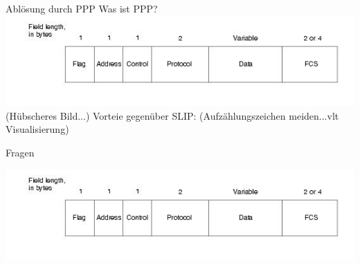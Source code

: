 \documentclass[beamer]{uibk}
\begin{document}
\begin{frame}{Ablösung durch PPP}
Was ist PPP?\newline
\includegraphics[scale=0.5]{ppp.jpg}
(Hübscheres Bild...)\newline
Vorteie gegenüber SLIP:\newline
(Aufzählungszeichen meiden...vlt Visualisierung)
\end{frame}

\begin{frame}{Fragen}
\begin{center}
\includegraphics[scale=0.8]{ppp.jpg}
\end{center}

\end{frame}
\end{document}
